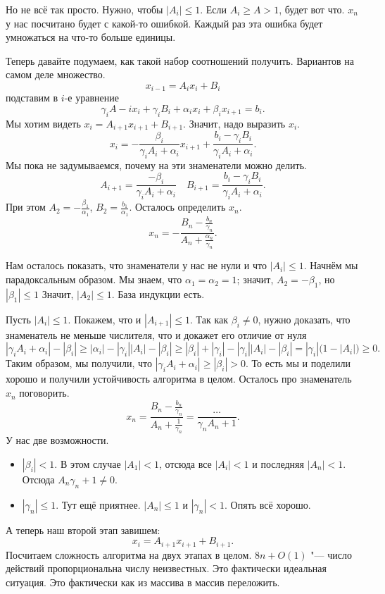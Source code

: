 Но не всё так просто. Нужно, чтобы $|A_i|\le 1$. Если $A_i\ge A>1$, будет вот что. $x_n$ у нас посчитано будет с какой-то ошибкой. Каждый раз эта ошибка будет умножаться на что-то больше единицы.

Теперь давайте подумаем, как такой набор соотношений получить. Вариантов на самом деле множество.
\[
  x_{i-1} = A_i x_i + B_i
\]
подставим в $i$-е уравнение
\[
  \gamma_i A-i x_i + \gamma_i B_i  + \alpha_i x_i + \beta_i x_{i+1} = b_i.
\]
Мы хотим видеть $x_i = A_{i+1} x_{i+1}  + B_{i+1}$. Значит, надо выразить $x_i$.
\[
  x_i = -\frac{\beta_i}{\gamma_i A_i + \alpha_i} x_{i+1} + \frac{b_i - \gamma_i B_i}{\gamma_i A_i + \alpha_i}.
\]
Мы пока не задумываемся, почему на эти знаменатели можно делить.
\[
  A_{i+1} = \frac{-\beta_i}{\gamma_i A_i + \alpha_i}\quad
  B_{i+1} = \frac{b_i - \gamma_i B_i}{\gamma_i A_i + \alpha_i}.
\]
При этом $A_2 = -\frac{\beta_1}{\alpha_1}$, $B_2 = \frac{b_1}{\alpha_1}$. Осталось определить $x_n$.
\[
  x_n = -\frac{B_n - \frac{b_n}{\gamma_n}}{A_n + \frac{\alpha_n}{\gamma_n}}.
\]

Нам осталось показать, что знаменатели у нас не нули и что $|A_i|\le 1$. Начнём мы парадоксальным образом. Мы знаем, что $\alpha_1 = \alpha_2 = 1$; значит, $A_2 = -\beta_1$, но $|\beta_1|\le 1$ Значит, $|A_2|\le 1$. База индукции есть.

Пусть $|A_i|\le 1$. Покажем, что и $|A_{i+1}|\le 1$. Так как $\beta_i\ne 0$, нужно доказать, что знаменатель не меньше числителя, что и докажет его отличие от нуля
\[
  |\gamma_i A_i + \alpha_i| - |\beta_i|\ge |\alpha_i| - |\gamma_i||A_i| - |\beta_i|\ge |\beta_i| + |\gamma_i| - |\gamma_i||A_i| - |\beta_i| = |\gamma_i|\big(1-|A_i|\big)\ge 0.
\]
Таким образом, мы получили, что $|\gamma_i A_i + \alpha_i|\ge |\beta_i|>0$. То есть мы и поделили хорошо и получили устойчивость алгоритма в целом. Осталось про знаменатель $x_n$ поговорить.
\[
  x_n = \frac{B_n - \frac{b_n}{\gamma_n}}{A_n+\frac1{\gamma_n}} = 
   \frac{\dots}{\gamma_n A_n +1}.
\]
У нас две возможности.
\begin{itemize}
  \item $|\beta_i|<1$. В этом случае $|A_1|<1$, отсюда все $|A_i|<1$ и последняя $|A_n|<1$. Отсюда $A_n\gamma_n + 1\ne 0$.
  \item $|\gamma_n|\le 1$. Тут ещё приятнее. $|A_n|\le 1$ и $|\gamma_n|<1$. Опять всё хорошо.
\end{itemize}

А теперь наш второй этап завишем:
\[
  x_i = A_{i+1} x_{i+1} + B_{i+1}.
\]
Посчитаем сложность алгоритма на двух этапах в целом. $8n + O(1)$ "--- число действий пропорциональна числу неизвестных. Это фактически идеальная ситуация. Это фактически как из массива в массив переложить.
